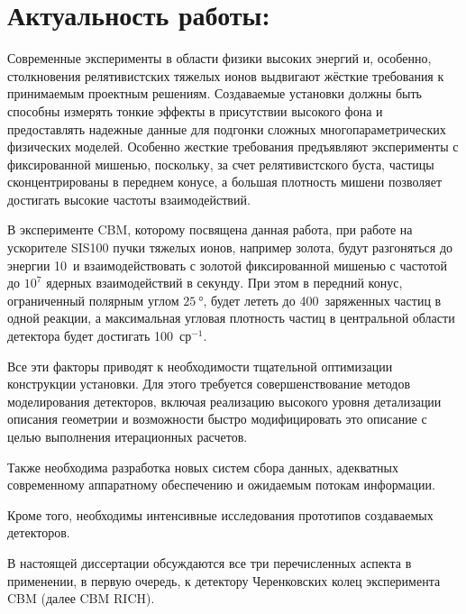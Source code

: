 \section*{Актуальность работы:}

Современные эксперименты в области физики высоких энергий и, особенно, столкновения релятивистских тяжелых ионов выдвигают жёсткие требования к принимаемым проектным решениям. Создаваемые установки должны быть способны измерять тонкие эффекты в присутствии высокого фона и предоставлять надежные данные для подгонки сложных многопараметрических физических моделей. Особенно жесткие требования предъявляют эксперименты с фиксированной мишенью, поскольку, за счет релятивистского буста, частицы сконцентрированы в переднем конусе, а большая плотность мишени позволяет достигать высокие частоты взаимодействий.

В эксперименте CBM, которому посвящена данная работа, при работе на ускорителе SIS100 пучки тяжелых ионов, например золота, будут разгоняться до энергии 10~\GeVperNucl и взаимодействовать с золотой фиксированной мишенью с частотой до $10^7$ ядерных взаимодействий в секунду. При этом в передний конус, ограниченный полярным углом $\SI{25}{\degree}$, будет лететь до 400~заряженных частиц в одной реакции, а максимальная угловая плотность частиц в центральной области детектора будет достигать 100~ср$^{-1}$.

Все эти факторы приводят к необходимости тщательной оптимизации конструкции установки. Для этого требуется совершенствование методов моделирования детекторов, включая реализацию высокого уровня детализации описания геометрии и возможности быстро модифицировать это описание с целью выполнения итерационных расчетов.

Также необходима разработка новых систем сбора данных, адекватных современному аппаратному обеспечению и ожидаемым потокам информации.

Кроме того, необходимы интенсивные исследования прототипов создаваемых детекторов.

В настоящей диссертации обсуждаются все три перечисленных аспекта в применении, в первую очередь, к детектору Черенковских колец эксперимента CBM (далее CBM RICH).